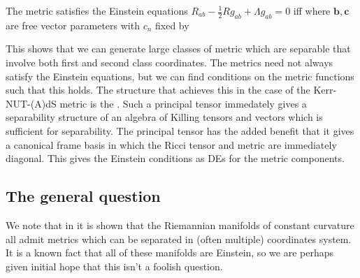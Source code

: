 \documentclass{article}
\begin{document}
\begin{prop}
	The metric satisfies the Einstein equations $R_{ab} - \frac{1}{2}R g_{ab} + \Lambda g_{ab} =0$ iff 
where $\bm{b},\bm{c}$ are free vector parameters with $c_n$ fixed by 
\end{prop}

This shows that we can generate large classes of metric which are separable that involve both first and second class coordinates. The metrics need not always satisfy the Einstein equations, but we can find conditions on the metric functions such that this holds. The structure that achieves this in the case of the Kerr-NUT-(A)dS metric is the . Such a principal tensor immedately gives a separability structure of an algebra of Killing tensors and vectors which is sufficient for separability. The principal tensor has the added benefit that it gives a canonical frame basis in which the Ricci tensor and metric are immediately diagonal. This gives the Einstein conditions as DEs for the metric components. 

\subsection{The general question}

\begin{example}
We note that in \cite{Kalnins1986} it is shown that the Riemannian manifolds of constant curvature all admit metrics which can be separated in (often multiple) coordinates system. It is a known fact that all of these manifolds are Einstein, so we are perhaps given initial hope that this isn't a foolish question. 
\end{example}
\end{document}
